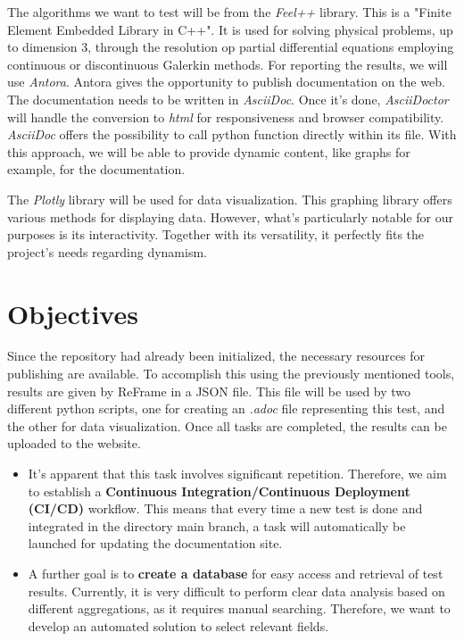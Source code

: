 \documentclass[12pt]{article}
\begin{document}
The algorithms we want to test will be from the \textit{Feel++}\cite*{Feel++} library.
This is a "Finite Element Embedded Library in C++". It is used for solving physical problems, up to dimension 3,
through the resolution op partial differential equations employing continuous or discontinuous Galerkin methods.
\newpage
For reporting the results, we will use \textit{Antora}\cite*{Antora}. Antora gives the opportunity to publish documentation on the web.
The documentation needs to be written in \textit{AsciiDoc}. Once it's done, \textit{AsciiDoctor} will handle the conversion to \textit{html}
for responsiveness and browser compatibility.
\textit{AsciiDoc} offers the possibility to call python function directly within its file. With this approach, we will be able to provide dynamic content,
like graphs for example, for the documentation.

The \textit{Plotly} library will be used for data visualization. This graphing library offers various methods for displaying data. However,
what's particularly notable for our purposes is its interactivity. Together with its versatility, it perfectly fits the project's needs
regarding dynamism.


\section{Objectives}
Since the repository had already been initialized, the necessary resources for publishing are available.
To accomplish this using the previously mentioned tools, results are given by ReFrame in a JSON file.
This file will be used by two different python scripts,
one for creating an \textit{.adoc} file representing this test, and the other for data visualization.
Once all tasks are completed, the results can be uploaded to the website.

\begin{itemize}
    \item It's apparent that this task involves significant repetition. Therefore, we aim to establish a \textbf{Continuous Integration/Continuous Deployment (CI/CD)} workflow.
    This means that every time a new test is done and integrated in the directory main branch, a task will automatically be launched for updating the documentation site.
    \item A further goal is to \textbf{create a database} for easy access and retrieval of test results.
    Currently, it is very difficult to perform clear data analysis based on different aggregations, as it requires manual searching.
    Therefore, we want to develop an automated solution to select relevant fields.
\end{itemize}
\end{document}
